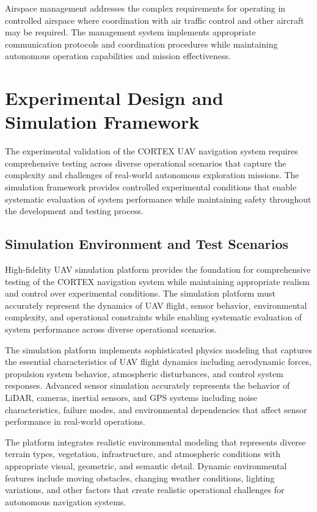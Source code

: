 Airspace management addresses the complex requirements for operating in controlled airspace where coordination with air traffic control and other aircraft may be required. The management system implements appropriate communication protocols and coordination procedures while maintaining autonomous operation capabilities and mission effectiveness.

\section{Experimental Design and Simulation Framework}

The experimental validation of the CORTEX UAV navigation system requires comprehensive testing across diverse operational scenarios that capture the complexity and challenges of real-world autonomous exploration missions. The simulation framework provides controlled experimental conditions that enable systematic evaluation of system performance while maintaining safety throughout the development and testing process.

\subsection{Simulation Environment and Test Scenarios}

High-fidelity UAV simulation platform provides the foundation for comprehensive testing of the CORTEX navigation system while maintaining appropriate realism and control over experimental conditions. The simulation platform must accurately represent the dynamics of UAV flight, sensor behavior, environmental complexity, and operational constraints while enabling systematic evaluation of system performance across diverse operational scenarios.

The simulation platform implements sophisticated physics modeling that captures the essential characteristics of UAV flight dynamics including aerodynamic forces, propulsion system behavior, atmospheric disturbances, and control system responses. Advanced sensor simulation accurately represents the behavior of LiDAR, cameras, inertial sensors, and GPS systems including noise characteristics, failure modes, and environmental dependencies that affect sensor performance in real-world operations.

The platform integrates realistic environmental modeling that represents diverse terrain types, vegetation, infrastructure, and atmospheric conditions with appropriate visual, geometric, and semantic detail. Dynamic environmental features include moving obstacles, changing weather conditions, lighting variations, and other factors that create realistic operational challenges for autonomous navigation systems.

